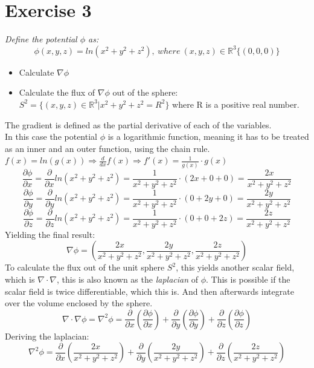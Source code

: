 \section{Exercise 3}
\textit{Define the potential $\phi$ as:}
\[\phi(x,y,z) = ln(x^2 + y^2 + z^2), \ where \  (x,y,z) \in \mathbb{R}^3 \{(0,0,0)\}\]

\begin{itemize}
    \item Calculate $\nabla\phi$
    \item Calculate the flux of $\nabla\phi$ out of the sphere: $S^2 = \{(x,y,z)\in\mathbb{R}^3 |x^2+y^2+z^2 = R^2\}$ where R is a positive real number.
\end{itemize}

The gradient is defined as the partial derivative of each of the variables.\\ 
In this case the potential $\phi$ is a logarithmic function, meaning it has to be treated as an inner and an outer function, using the chain rule.
$f(x) = ln(g(x)) \Rightarrow \frac{d}{dx} f(x) \Rightarrow f'(x) = \frac{1}{g(x)} \cdot g(x)$\\
\[\frac{\partial \phi}{\partial x} = 
\frac{\partial}{\partial x}ln(x^2 + y^2 + z^2) = 
\frac{1}{x^2+y^2+z^2} \cdot (2x + 0 + 0) = 
\frac{2x}{x^2+y^2+z^2}\]
\[\frac{\partial \phi}{\partial y} = 
\frac{\partial}{\partial y}ln(x^2 + y^2 + z^2) = 
\frac{1}{x^2+y^2+z^2} \cdot (0 + 2y + 0) = 
\frac{2y}{x^2+y^2+z^2}\]
\[\frac{\partial \phi}{\partial z} = 
\frac{\partial}{\partial z}ln(x^2 + y^2 + z^2) = 
\frac{1}{x^2+y^2+z^2} \cdot (0 + 0 + 2z) = 
\frac{2z}{x^2+y^2+z^2}\]
Yielding the final result:
\[\nabla\phi = \left(\frac{2x}{x^2+y^2+z^2}, \frac{2y}{x^2+y^2+z^2},\frac{2z}{x^2+y^2+z^2} \right)\]
To calculate the flux out of the unit sphere $S^2$, this yields another scalar field, which is $\nabla \cdot \nabla$, this
is also known as the \textit{laplacian} of $\phi$. This is possible if the scalar field is twice differentiable, which this is. 
And then afterwards integrate over the volume enclosed by the sphere.
\[\nabla\cdot\nabla\phi = \nabla^2 \phi = 
\frac{\partial }{\partial x}\left(\frac{\partial \phi}{\partial x}\right) + 
\frac{\partial }{\partial y}\left(\frac{\partial \phi}{\partial y}\right) +
\frac{\partial }{\partial z}\left(\frac{\partial \phi}{\partial z}\right)
\]
Deriving the laplacian:
\[\nabla^2\phi = 
\frac{\partial }{\partial x}\left(\frac{2x}{x^2+y^2+z^2}\right) +
\frac{\partial }{\partial y}\left(\frac{2y}{x^2+y^2+z^2}\right) +
\frac{\partial }{\partial z}\left(\frac{2z}{x^2+y^2+z^2}\right)
\]
